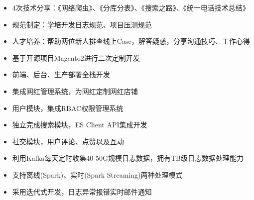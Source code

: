 \documentclass{resume}
\begin{document}
    \begin{onehalfspacing}
        \begin{itemize}
            \item 4次技术分享：《网络爬虫》、《分库分表》、《搜索之路》、《统一电话技术总结》
            \item 规范制定：学培开发日志规范、项目压测规范
            \item 人才培养：帮助两位新人排查线上Case，解答疑惑，分享沟通技巧、工作心得
        \end{itemize}
    \end{onehalfspacing}
    \blankline{ }

    \begin{onehalfspacing}
        \begin{itemize}
            \item 基于开源项目Magento2进行二次定制开发
            \item 前端、后台、生产部署全栈开发
            \item 集成网红管理系统，为网红定制网红店铺
        \end{itemize}
    \end{onehalfspacing}
    \blankline{ }

    \begin{onehalfspacing}
        \begin{itemize}
            \item 用户模块，集成RBAC权限管理系统
            \item 独立完成搜索模块，ES Client API集成开发
            \item 社交模块，用户评论、点赞以及互动
        \end{itemize}
    \end{onehalfspacing}
    \blankline{ }

    \begin{onehalfspacing}
        \begin{itemize}
            \item 利用Kafka每天定时收集40-50G规模日志数据，拥有TB级日志数据处理能力
            \item 支持离线(Spark)、实时(Spark Streaming)两种处理模式
            \item 采用迭代式开发，日志异常报错实时邮件通知
        \end{itemize}
    \end{onehalfspacing}
    \blankline{ }
\end{document}
